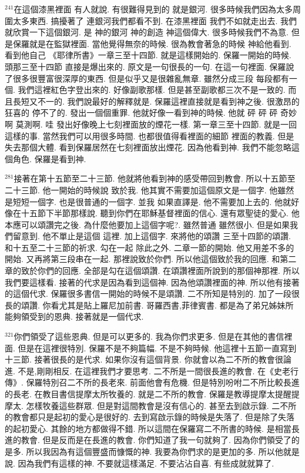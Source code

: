 \documentclass{book}
\begin{document}
$^{241}$在這個漆黑裡面 有人就說.
有很難得見到的 就是銀河.
很多時候我們因為太多周圍太多東西.
搞擾著了 連銀河我們都看不到.
在漆黑裡面 我們不如就走出去.
我們就欣賞一下這個銀河.
是 神的銀河 神的創造 神這個偉大.
很多時候我們不為意.
但是保羅就是在監獄裡面.
當他覺得無奈的時候.
很為教會著急的時候 神給他看到.
看到他自己 《耶律所書》一章三至十四節.
就是這樣開始的.
保羅一開始的時候.
頭那三至十四節 直接是爆出來的.
原文是一句很長的一句.
在這一句裡面.
保羅說了很多很豐富很深厚的東西.
但是似乎又是很雜亂無章.
雖然分成三段 每段都有一個.
我們這裡紅色字登出來的.
好像副歌那樣.
但是甚至副歌都三次不是一致的.
而且長短又不一的.
我們說最好的解釋就是.
保羅這裡直接就是看到神之後.
很激昂的 狂喜的 停不了的.
發出一個個重罪.
他就好像一看到神的時候.
他就 砰 砰 砰 奇妙啊 莫測啊.
哇 發出好像晚上七刻裡面放的煙花一樣.
第一章三至十四節.
就是一回這樣的事.
當然我們可以用很多時間.
也都很值得看裡面的細節 裡面的教義.
但是失去那個大體.
看到保羅居然在七刻裡面放出煙花.
因為他看到神.
我們不能忽略這個角色.
保羅是看到神.

$^{281}$接著在第十五節至二十三節.
他就將他看到神的感受帶回到教會.
所以十五節至二十三節.
他一開始的時候說 致於我.
他其實不需要加這個原文是一個字.
他雖然是短短一個字.
也是很普通的一個字.
並我 如果直譯是.
他不需要加上去的.
他就好像在十五節下半節那樣說.
聽到你們在耶穌基督裡面的信心.
還有眾聖徒的愛心.
他本應可以頌讚完之後.
為什麼他要加上這個字呢?.
雖然普通 雖然很小.
但是如果我們留意到.
他不單止是這個 這裡.
加上這個字.
來將他的頌讚 三至十四節的頌讚.
和十五至二十三節的祈求.
勾在一起 除此之外.
二章一節的開始.
他又用差不多的開始.
又再將第三段串在一起.
那裡說致於你們.
所以他這個致於我的回應.
和第二章的致於你們的回應.
全部是勾在這個頌讚.
在頌讚裡面所說到的那個神那裡.
所以我們要這樣看.
接著的代求是因為看到這個神.
因為他頌讚裡面的神.
所以他有接著的這個代求.
保羅很多書信一開始的時候不是頌讚.
二不所知是特別的.
加了一段很長的頌讚.
你看尤其是貼上羅尼加前書.
哥羅西書,菲律賓書.
都是為了弟兄姊妹所能夠領受到的恩典.
接著就是一個代求.

$^{321}$你們領受了這些恩典.
但是可以更多的.
我為你們求更多.
但是在其他的書信裡面.
但是在這裡很特別.
保羅不是不夠篇幅.
不是不夠時候.
他這裡十五節一直寫到十三節.
接著很長的是代求.
如果你沒有這個背景.
你就會以為二不所的教會很論進.
不是,剛剛相反.
在這裡我們才要思考.
二不所是一間很長進的教會.
在《史老行傳》.
保羅特別召二不所的長老來.
前面他會有危機.
但是特別吩咐二不所比較長進的長老.
在教目書信提摩太所牧養的.
就是二不所的教會.
保羅是教導提摩太提醒提摩太.
怎樣牧養這些群眾.
但是對這間教會是沒有信心的.
甚至去到啟示錄.
二不所的教會都只是起初的愛心是很好的.
去到寫啟示錄的時候是失落了.
但是除了失落的起初愛心.
其餘的地方都做得不錯.
所以這間在保羅寫二不所書的時候.
是相當長進的教會.
但是反而是在長進的教會.
你們知道了我一句就夠了.
因為你們領受了的是多.
所以我因為有這個豐盛而慷慨的神.
我要為你們求的是更加的多.
所以他就是說.
因為我們有這樣的神.
不要就這樣滿足.
不要沾沾自喜.
有些成就就算了.
\end{document}
